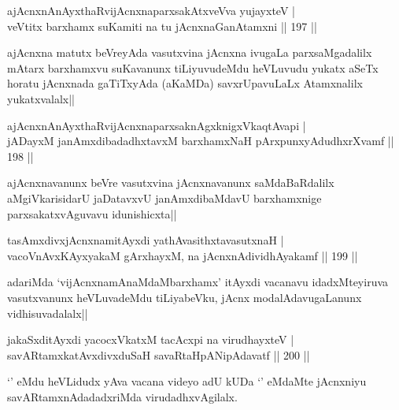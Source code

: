 \begin{shl}
ajAcnxnAnAyxthaRvijAcnxnaparxsakAtxveVva yujayxteV |\\
veVtitx barxhamx suKamiti na tu jAcnxnaGanAtamxni \hfill || 197 ||
\end{shl}

\begin{artha}
ajAcnxna matutx beVreyAda vasutxvina jAcnxna ivugaLa parxsaMgadalilx mAtarx barxhamxvu suKavanunx tiLiyuvudeMdu heVLuvudu yukatx aSeTx horatu jAcnxnada gaTiTxyAda (aKaMDa) savxrUpavuLaLx Atamxnalilx yukatxvalalx||
\end{artha}


\begin{shl}
ajAcnxnAnAyxthaRvijAcnxnaparxsaknAgxknigxVkaqtAvapi |\\
jADayxM janAmxdibadadhxtavxM barxhamxNaH pArxpunxyAdudhxrXvamf \hfill || 198 ||
\end{shl}

\begin{artha}
ajAcnxnavanunx beVre vasutxvina jAcnxnavanunx saMdaBaRdalilx aMgiVkarisidarU jaDatavxvU janAmxdibaMdavU barxhamxnige parxsakatxvAguvavu idunishicxta||
\end{artha}

\begin{shl}
tasAmxdivxjAcnxnamitAyxdi yathAvasithxtavasutxnaH |\\
vacoV\s nAvxKAyxyakaM gArxhayxM, na jAcnxnAdividhAyakamf \hfill || 199 ||
\end{shl}

\begin{artha}
adariMda `vijAcnxnamAnaMdaMbarxhamx' itAyxdi vacanavu idadxMteyiruva vasutxvanunx heVLuvadeMdu tiLiyabeVku, jAcnx modalAdavugaLanunx vidhisuvadalalx||
\end{artha}

\begin{shl}
jakaSxditAyxdi yacocxVkatxM tacAcxpi na virudhayxteV |\\
savARtamxkatAvxdivxduSaH savaRtaHpANipAdavatf \hfill || 200 \hfill || 
\end{shl}

\begin{artha}
`\stext ' eMdu heVLidudx yAva vacana videyo adU kUDa `\stext ' eMdaMte jAcnxniyu savARtamxnAdadadxriMda virudadhxvAgilalx. 
\end{artha}


